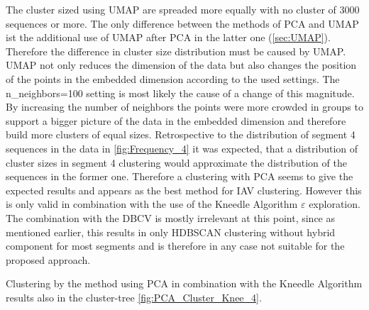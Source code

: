 The cluster sized using \gls{UMAP} are spreaded more equally with no cluster of 3000 sequences or more. The only difference between the methods of \gls{PCA} and \gls{UMAP} ist the additional use of \gls{UMAP} after \gls{PCA} in the latter one (\autoref{sec:UMAP}). Therefore the difference in cluster size distribution must be caused by \gls{UMAP}. \gls{UMAP} not only reduces the dimension of the data but also changes the position of the points in the embedded dimension according to the used settings. The \colorbox{backcolour}{n\_neighbors=100} setting is most likely the cause of a change of this magnitude. By increasing the number of neighbors the points were more crowded in groups to support a bigger picture of the data in the embedded dimension and therefore build more clusters of equal sizes. Retrospective to the distribution of segment 4 sequences in the data in \autoref{fig:Frequency_4} it was expected, that a distribution of cluster sizes in segment 4 clustering would approximate the distribution of the sequences in the former one. Therefore a clustering with \gls{PCA} seems to give the expected results and appears as the best method for \gls{IAV} clustering. However this is only valid in combination with the use of the Kneedle Algorithm $\varepsilon$ exploration. The combination with the \gls{DBCV} is mostly irrelevant at this point, since as mentioned earlier, this results in only \gls{HDBSCAN} clustering without hybrid component for most segments and is therefore in any case not suitable for the proposed approach. 


Clustering by the method using \gls{PCA} in combination with the Kneedle Algorithm results also in the cluster-tree \autoref{fig:PCA_Cluster_Knee_4}. 

